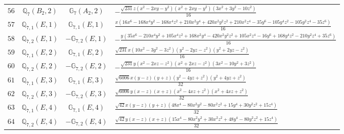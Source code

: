 \documentclass[fleqn,8pt,landscape]{jsarticle}
\begin{document}
\begin{table}[ht!]
\begin{center}
\begin{tabular}{cccl}
$ 56 $ & $ \mathbb{Q}_{7}(B_{2},2) $ & $ \mathbb{G}_{7}(A_{2},2) $ & $ - \frac{\sqrt{231} z \left(x^{2} - 2 x y - y^{2}\right) \left(x^{2} + 2 x y - y^{2}\right) \left(3 x^{2} + 3 y^{2} - 10 z^{2}\right)}{16} $ \\
$ 57 $ & $ \mathbb{Q}_{7,1}(E,1) $ & $ \mathbb{G}_{7,1}(E,1) $ & $ \frac{x \left(16 x^{6} - 168 x^{4} y^{2} - 168 x^{4} z^{2} + 210 x^{2} y^{4} + 420 x^{2} y^{2} z^{2} + 210 x^{2} z^{4} - 35 y^{6} - 105 y^{4} z^{2} - 105 y^{2} z^{4} - 35 z^{6}\right)}{16} $ \\
$ 58 $ & $ \mathbb{Q}_{7,2}(E,1) $ & $ -\mathbb{G}_{7,2}(E,1) $ & $ - \frac{y \left(35 x^{6} - 210 x^{4} y^{2} + 105 x^{4} z^{2} + 168 x^{2} y^{4} - 420 x^{2} y^{2} z^{2} + 105 x^{2} z^{4} - 16 y^{6} + 168 y^{4} z^{2} - 210 y^{2} z^{4} + 35 z^{6}\right)}{16} $ \\
$ 59 $ & $ \mathbb{Q}_{7,1}(E,2) $ & $ \mathbb{G}_{7,1}(E,2) $ & $ \frac{\sqrt{231} x \left(10 x^{2} - 3 y^{2} - 3 z^{2}\right) \left(y^{2} - 2 y z - z^{2}\right) \left(y^{2} + 2 y z - z^{2}\right)}{16} $ \\
$ 60 $ & $ \mathbb{Q}_{7,2}(E,2) $ & $ -\mathbb{G}_{7,2}(E,2) $ & $ - \frac{\sqrt{231} y \left(x^{2} - 2 x z - z^{2}\right) \left(x^{2} + 2 x z - z^{2}\right) \left(3 x^{2} - 10 y^{2} + 3 z^{2}\right)}{16} $ \\
$ 61 $ & $ \mathbb{Q}_{7,1}(E,3) $ & $ \mathbb{G}_{7,1}(E,3) $ & $ \frac{\sqrt{6006} x \left(y - z\right) \left(y + z\right) \left(y^{2} - 4 y z + z^{2}\right) \left(y^{2} + 4 y z + z^{2}\right)}{32} $ \\
$ 62 $ & $ \mathbb{Q}_{7,2}(E,3) $ & $ -\mathbb{G}_{7,2}(E,3) $ & $ \frac{\sqrt{6006} y \left(x - z\right) \left(x + z\right) \left(x^{2} - 4 x z + z^{2}\right) \left(x^{2} + 4 x z + z^{2}\right)}{32} $ \\
$ 63 $ & $ \mathbb{Q}_{7,1}(E,4) $ & $ \mathbb{G}_{7,1}(E,4) $ & $ \frac{\sqrt{42} x \left(y - z\right) \left(y + z\right) \left(48 x^{4} - 80 x^{2} y^{2} - 80 x^{2} z^{2} + 15 y^{4} + 30 y^{2} z^{2} + 15 z^{4}\right)}{32} $ \\
$ 64 $ & $ \mathbb{Q}_{7,2}(E,4) $ & $ -\mathbb{G}_{7,2}(E,4) $ & $ \frac{\sqrt{42} y \left(x - z\right) \left(x + z\right) \left(15 x^{4} - 80 x^{2} y^{2} + 30 x^{2} z^{2} + 48 y^{4} - 80 y^{2} z^{2} + 15 z^{4}\right)}{32} $ \\
 \hline \hline
\end{tabular}
\end{center}
\end{table}
\end{document}
